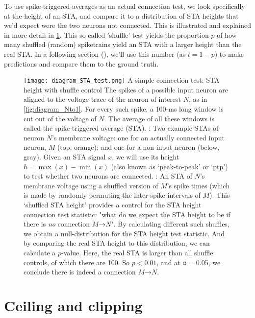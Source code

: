 To use spike-triggered-averages as an actual connection test, we look specifically at the height of an STA, and compare it to a distribution of STA heights that we'd expect were the two neurons not connected. This is illustrated and explained in more detail in \cref{fig:STA-height-suffle}. This so called 'shuffle' test yields the proportion $p$ of how many shuffled (random) spiketrains yield an STA with a larger height than the real STA. In a following section (), we'll use this number (as $t = 1 - p$) to make predictions and compare them to the ground truth.

\begin{figure}
    \hspace{-5em}
    \texttt{[image: diagram\_STA\_test.png]}
    \captionn
        {A simple connection test: STA height with shuffle control}
        {The spikes of a possible input neuron are aligned to the voltage trace of the neuron of interest $N$, as in \cref{fig:diagram_Nto1}. For every such spike, a 100-ms long window is cut out of the voltage of $N$. The average of all these windows is called the spike-triggered average (STA).\newline
        \Left: Two example STAs of neuron $N$'s membrane voltage: one for an actually connected input neuron, $M$ (top, orange); and one for a non-input neuron (below, gray).
        Given an STA signal $x$, we will use its height $h = \max(x) - \min(x)$ (also known as `peak-to-peak' or `ptp') to test whether two neurons are connected. \newline
        \Right: An STA of $N$'s membrane voltage using a shuffled version of $M$'s spike times (which is made by randomly permuting the inter-spike-intervals of $M$). This `shuffled STA height' provides a control for the STA height connection test statistic: "what do we expect the STA height to be if there is \emph{no} connection $M$→$N$".
        By calculating different such shuffles, we obtain a null-distribution for the STA height test statistic. And by comparing the real STA height to this distribution, we can calculate a $p$-value. Here, the real STA is larger than all shuffle controls, of which there are 100. So $p < 0.01$, and at α = 0.05, we conclude there is indeed a connection $M$→$N$.}
    \label{fig:STA-height-suffle}
\end{figure}



\FloatBarrier
\section{Ceiling and clipping}
\label{sec:ceil-n-clip}

